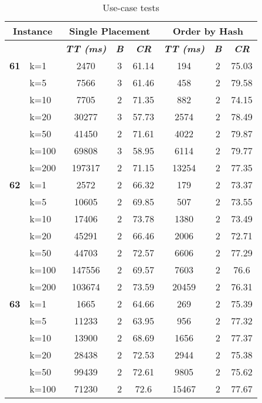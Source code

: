     \begin{table}[htbp]
    \caption{Use-case tests}
    \begin{tabular}{|l|l|c|c|c|c|c|c|}
    
    \multicolumn{ 2}{|c|}{\textbf{Instance}} & \multicolumn{ 3}{c|}{\textbf{Single Placement}} & \multicolumn{ 3}{c|}{\textbf{Order by Hash}} \\ \hline
    \multicolumn{ 2}{|l|}{} & \textbf{\textit{TT (ms)}} & \textbf{\textit{B}} & \textbf{\textit{CR}} & \textbf{\textit{TT (ms)}} & \textbf{\textit{B}} & \textbf{\textit{CR}} \\ \hline
    \multicolumn{1}{|r|}{\textbf{61}} & k=1 & 2470 & 3 & 61.14 & 194 & 2 & 75.03 \\ 
     & k=5 & 7566 & 3 & 61.46 & 458 & 2 & 79.58 \\ 
     & k=10 & 7705 & 2 & 71.35 & 882 & 2 & 74.15 \\ 
     & k=20 & 30277 & 3 & 57.73 & 2574 & 2 & 78.49 \\ 
     & k=50 & 41450 & 2 & 71.61 & 4022 & 2 & 79.87 \\ 
     & k=100 & 69808 & 3 & 58.95 & 6114 & 2 & 79.77 \\ 
     & k=200 & 197317 & 2 & 71.15 & 13254 & 2 & 77.35 \\ \hline
    \multicolumn{1}{|r|}{\textbf{62}} & k=1 & 2572 & 2 & 66.32 & 179 & 2 & 73.37 \\ 
     & k=5 & 10605 & 2 & 69.85 & 507 & 2 & 73.55 \\ 
     & k=10 & 17406 & 2 & 73.78 & 1380 & 2 & 73.49 \\ 
     & k=20 & 45291 & 2 & 66.46 & 2006 & 2 & 72.71 \\ 
     & k=50 & 44703 & 2 & 72.57 & 6606 & 2 & 77.29 \\ 
     & k=100 & 147556 & 2 & 69.57 & 7603 & 2 & 76.6 \\ 
     & k=200 & 103674 & 2 & 73.59 & 20459 & 2 & 76.31 \\ \hline
    \multicolumn{1}{|r|}{\textbf{63}} & k=1 & 1665 & 2 & 64.66 & 269 & 2 & 75.39 \\ 
     & k=5 & 11233 & 2 & 63.95 & 956 & 2 & 77.32 \\ 
     & k=10 & 13900 & 2 & 68.69 & 1656 & 2 & 77.37 \\ 
     & k=20 & 28438 & 2 & 72.53 & 2944 & 2 & 75.38 \\ 
     & k=50 & 99439 & 2 & 72.61 & 9805 & 2 & 75.62 \\ 
     & k=100 & 71230 & 2 & 72.6 & 15467 & 2 & 77.67 \\ 

\end{tabular}
\end{table}
